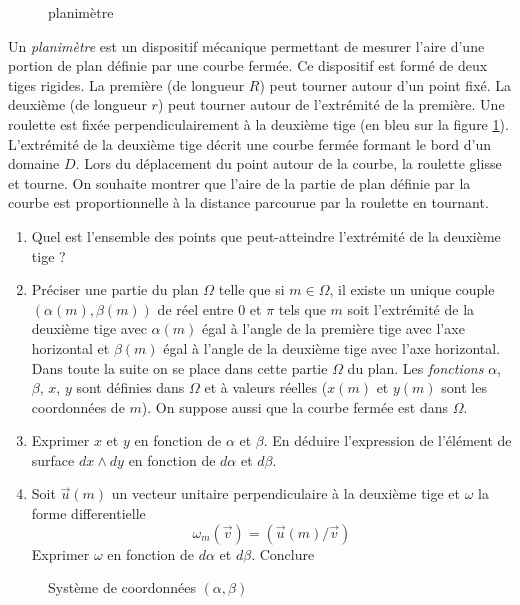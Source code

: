 \begin{figure}
   \centering
   
   \caption{planim{\`e}tre}
   \label{fig:Eplanimetre_1}
\end{figure}
Un \emph{planimètre} est un dispositif mécanique permettant de mesurer l'aire d'une portion de plan définie par une courbe fermée.\newline
Ce dispositif est formé de deux tiges rigides. La première (de longueur $R$) peut tourner autour d'un point fixé. La deuxième (de longueur $r$) peut tourner autour de l'extrémité de la première. Une roulette est fixée perpendiculairement à la deuxième tige (en bleu sur la figure \ref{fig:Eplanimetre_1}). L'extrémité de la deuxième tige décrit une courbe fermée formant le bord d'un domaine $D$.\newline
Lors du déplacement du point autour de la courbe, la roulette glisse et tourne. On souhaite montrer que l'aire de la partie de plan définie par la courbe est proportionnelle à la distance parcourue par la roulette en tournant.
\begin{enumerate}
\item Quel est l'ensemble des points que peut-atteindre l'extrémité de la deuxième tige ?
\item Préciser une partie du plan $\Omega$ telle que si $m\in \Omega$, il existe un unique couple $(\alpha(m),\beta(m))$ de réel entre $0$ et $\pi$ tels que $m$ soit l'extrémité de la deuxième tige avec $\alpha(m)$ égal à l'angle de la première tige avec l'axe horizontal et $\beta(m)$ égal à l'angle de la deuxième tige avec l'axe horizontal.\newline
Dans toute la suite on se place dans cette partie $\Omega$ du plan. Les \emph{fonctions} $\alpha$, $\beta$, $x$, $y$ sont définies dans $\Omega$ et à valeurs réelles ($x(m)$ et $y(m)$ sont les coordonnées de $m$). On suppose aussi que la courbe fermée est dans $\Omega$.
\item Exprimer $x$ et $y$ en fonction de $\alpha$ et $\beta$. En déduire l'expression de l'élément de surface $dx\wedge dy$ en fonction de $d\alpha$ et $d\beta$.
\item Soit $\overrightarrow{u}(m)$ un vecteur unitaire perpendiculaire à la deuxième tige et $\omega$ la forme differentielle
\[\omega_{m}(\overrightarrow{v})=(\overrightarrow{u}(m)/\overrightarrow{v})\]
Exprimer $\omega$ en fonction de $d\alpha$ et $d\beta$. Conclure
\end{enumerate}
\begin{figure}
   \centering
   
   \caption{Système de coordonnées $(\alpha,\beta)$}
   \label{fig:Eplanimetre_2}
\end{figure}


